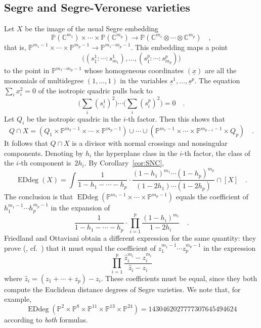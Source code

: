 \documentclass[11pt]{amsart}
\numberwithin{equation}{section}
\newcommand{\Cbb}{{\mathbb{C}}}
\newcommand{\Pbb}{{\mathbb{P}}}
\newcommand{\us}{\underline s}
\newcommand{\ux}{\underline x}
\DeclareMathOperator{\Edd}{EDdeg}
\begin{document}
\subsection{Segre and Segre-Veronese varieties}\label{ss:Segre}
Let $X$ be the image of the usual Segre embedding
\[
\Pbb(\Cbb^{m_1})\times \cdots \times \Pbb(\Cbb^{m_p}) \to 
\Pbb(\Cbb^{m_1}\otimes \cdots \otimes \Cbb^{m_p})\quad,
\]
that is,
$\Pbb^{m_1-1}\times \cdots \times \Pbb^{m_p-1} \to \Pbb^{m_1\cdots m_p -1}$.
This embedding maps a point
\[
\big(
(s_1^1:\cdots: s_{m_1}^1),\dots, (s_1^p:\cdots: s_{m_p}^p)
\big)
\]
to the point in $\Pbb^{m_1\cdots m_p -1}$ whose homogeneous coordinates $(\ux)$
are all the monomials of multidegree $(1,\dots, 1)$ in the variables $\us^1,\dots, \us^p$.
The equation $\sum_i x_i^2=0$ of the isotropic quadric pulls back to 
\[
\big(\sum_i (s_i^1)^2\big)\cdots \big(\sum_i (s_i^p)^2\big)=0\quad.
\]
Let $Q_i$ be the isotropic quadric in the $i$-th factor. Then this shows that
\[
Q\cap X = (Q_1 \times \Pbb^{m_2-1}\times \cdots \times \Pbb^{m_p-1})
\cup\cdots \cup
(\Pbb^{m_1-1}\times \cdots \times \Pbb^{m_{p-1}-1}\times Q_p)\quad.
\]
It follows that $Q\cap X$ is a divisor with normal crossings and nonsingular components.
Denoting by $h_i$ the hyperplane class in the $i$-th factor, the class of the $i$-th
component is~$2h_i$. By Corollary~\ref{cor:SNC}, 
\begin{equation}\label{eq:Segre}
\Edd(X) = \int\frac 1{1-h_1-\cdots -h_p}\cdot \frac{(1-h_1)^{m_1}\cdots (1-h_p)^{m_p}}
{(1-2h_1)\cdots (1-2h_p)}\cap [X]\quad.
\end{equation}
The conclusion is that 
$\Edd(\Pbb^{m_1-1}\times \cdots \times \Pbb^{m_p-1})$
equals the coefficient of $h_1^{m_1-1}\cdots h_p^{m_p-1}$ in the expansion of
\[
\frac 1{1-h_1-\cdots -h_p}\cdot \prod_{i=1}^p \frac{(1-h_i)^{m_i}}{1-2h_i}\quad.
\]
Friedland and Ottaviani obtain a different expression for the same quantity: they 
prove (\cite[Theorem 4]{MR3273677}, cf.~\cite[Theorem 8.1]{MR3451425}) 
that it must equal the coefficient of
$z_1^{m_1-1}\cdots z_p^{m_p-1}$ in the expression
\begin{equation}\label{eq:FO}
\prod_{i=1}^p \frac{\hat z_i^{m_i} - z_i^{m_i}}{\hat z_i -z_i}
\end{equation}
where $\hat z_i = (z_1+\cdots + z_p)-z_i$. These coefficients must be equal, 
since they both compute the Euclidean distance degrees of Segre varieties.
We note that, for example, 
\[
\Edd(\Pbb^2\times \Pbb^8\times \Pbb^{11}\times \Pbb^{13}\times \Pbb^{24})=
1430462027777307645494624
\]
according to {\em both\/} formulas.
\end{document}
